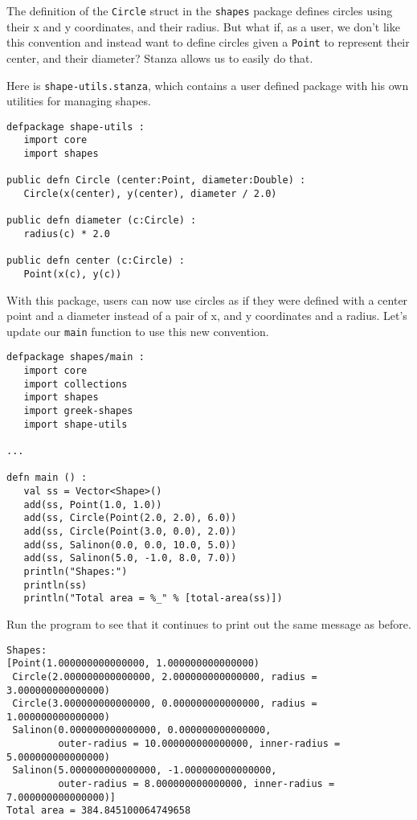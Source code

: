 \documentclass[10pt,oneside]{book}
\begin{document}
The definition of the \texttt{\frenchspacing Circle} struct in the \texttt{\frenchspacing shapes} package defines circles using their x and y coordinates, and their radius. But what if, as a user, we don't like this convention and instead want to define circles given a \texttt{\frenchspacing Point} to represent their center, and their diameter? Stanza allows us to easily do that.

Here is \texttt{\frenchspacing shape-utils.stanza}, which contains a user defined package with his own utilities for managing shapes. 
\begin{lstlisting}
defpackage shape-utils :
   import core
   import shapes

public defn Circle (center:Point, diameter:Double) :
   Circle(x(center), y(center), diameter / 2.0)

public defn diameter (c:Circle) :
   radius(c) * 2.0

public defn center (c:Circle) :
   Point(x(c), y(c))
\end{lstlisting}
With this package, users can now use circles as if they were defined with a center point and a diameter instead of a pair of x, and y coordinates and a radius. Let's update our \texttt{\frenchspacing main} function to use this new convention.
\begin{lstlisting}
defpackage shapes/main :
   import core
   import collections
   import shapes
   import greek-shapes
   import shape-utils

...
   
defn main () :
   val ss = Vector<Shape>()
   add(ss, Point(1.0, 1.0))
   add(ss, Circle(Point(2.0, 2.0), 6.0))
   add(ss, Circle(Point(3.0, 0.0), 2.0))
   add(ss, Salinon(0.0, 0.0, 10.0, 5.0))
   add(ss, Salinon(5.0, -1.0, 8.0, 7.0))
   println("Shapes:")
   println(ss)
   println("Total area = %_" % [total-area(ss)])
\end{lstlisting}
Run the program to see that it continues to print out the same message as before.
\begin{lstlisting}
Shapes:
[Point(1.000000000000000, 1.000000000000000)
 Circle(2.000000000000000, 2.000000000000000, radius = 3.000000000000000)
 Circle(3.000000000000000, 0.000000000000000, radius = 1.000000000000000)
 Salinon(0.000000000000000, 0.000000000000000,
         outer-radius = 10.000000000000000, inner-radius = 5.000000000000000)
 Salinon(5.000000000000000, -1.000000000000000,
         outer-radius = 8.000000000000000, inner-radius = 7.000000000000000)]
Total area = 384.845100064749658
\end{lstlisting}
\end{document}
